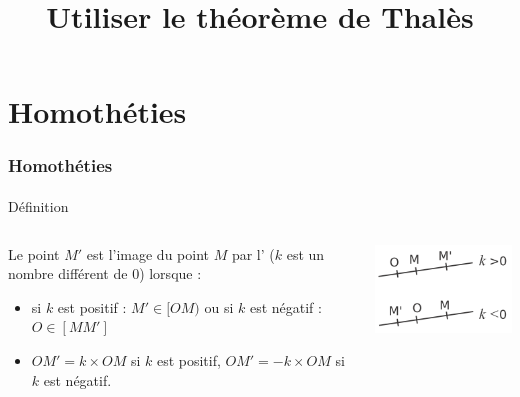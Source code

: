 \documentclass[xcolor={dvipsnames}]{beamer}
\title{Utiliser le théorème de Thalès}
\author{}\institute{}
\begin{document}
\begin{frame}
  \titlepage 
\end{frame}

\section{Homothéties}

\begin{frame}
	\frametitle{Homothéties}
	\framesubtitle{}
	
	\begin{alertblock}{Définition}
		
		\begin{columns}
			\begin{column}{8cm}
				
				Le point $M'$ est l'image du point $M$ par l' ($k$ est un nombre différent de $0$) lorsque :
				\begin{itemize}
					\item si $k$ est positif : $M' \in [OM) $ ou si $k$ est négatif : $O \in [MM']$
					\item $OM' = k \times OM$ si $k$ est positif, $OM'=-k \times OM$ si $k$ est négatif.
				\end{itemize}	
				
			\end{column}
			\begin{column}{4cm}
				\begin{center}
					\includegraphics[scale=0.65]{../img/homo_v2}
				\end{center}
			\end{column}
		\end{columns}
		
			
			
	\end{alertblock}
\end{frame}
\end{document}
